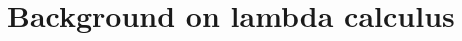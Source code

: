 \documentclass[english,letter paper,12pt,leqno]{article}
\theoremstyle{example}
\newtheorem{remark}[theorem]{Remark}
\numberwithin{equation}{section}
\begin{document}

\appendix

\section{Background on lambda calculus}\label{section:intro_lambda}
\end{document}
